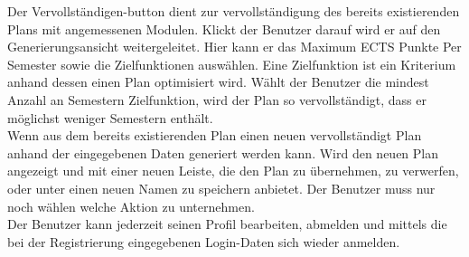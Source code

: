Der Vervollständigen-button dient zur vervollständigung des bereits existierenden Plans mit angemessenen Modulen. Klickt der Benutzer darauf  wird er auf den Generierungsansicht weitergeleitet. Hier kann er das Maximum ECTS Punkte Per Semester sowie die Zielfunktionen auswählen. Eine Zielfunktion ist ein Kriterium anhand dessen einen Plan optimisiert wird. Wählt der Benutzer die mindest Anzahl an Semestern Zielfunktion, wird der Plan so vervollständigt, dass er möglichst weniger Semestern enthält.  \\

Wenn aus dem bereits existierenden Plan einen neuen vervollständigt Plan anhand der eingegebenen Daten generiert werden kann. Wird den neuen Plan angezeigt und mit einer neuen Leiste, die den Plan zu übernehmen, zu verwerfen, oder unter einen neuen Namen zu speichern anbietet. Der Benutzer muss nur noch wählen welche Aktion zu unternehmen.\\

Der Benutzer kann jederzeit seinen Profil bearbeiten, abmelden und mittels die bei der Registrierung eingegebenen Login-Daten sich wieder anmelden.
